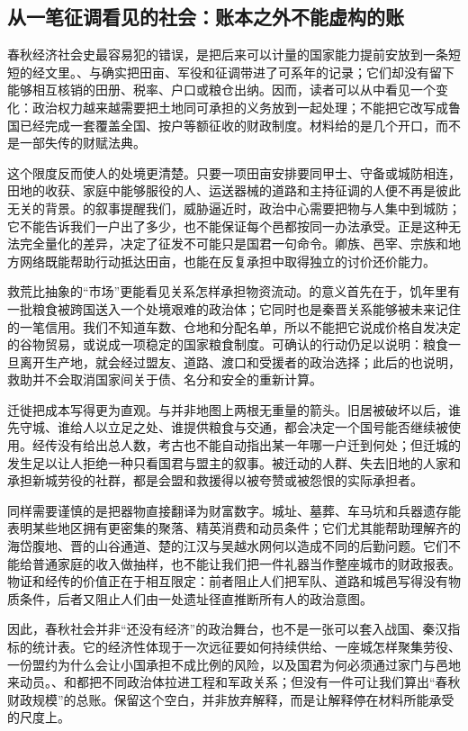 \subsection{从一笔征调看见的社会：账本之外不能虚构的账}

春秋经济社会史最容易犯的错误，是把后来可以计量的国家能力提前安放到一条短短的经文里。、与确实把田亩、军役和征调带进了可系年的记录；它们却没有留下能够相互核销的田册、税率、户口或粮仓出纳。因而，读者可以从中看见一个变化：政治权力越来越需要把土地同可承担的义务放到一起处理；不能把它改写成鲁国已经完成一套覆盖全国、按户等额征收的财政制度。材料给的是几个开口，而不是一部失传的财赋法典。

这个限度反而使人的处境更清楚。只要一项田亩安排要同甲士、守备或城防相连，田地的收获、家庭中能够服役的人、运送器械的道路和主持征调的人便不再是彼此无关的背景。的叙事提醒我们，威胁逼近时，政治中心需要把物与人集中到城防；它不能告诉我们一户出了多少，也不能保证每个邑都按同一办法承受。正是这种无法完全量化的差异，决定了征发不可能只是国君一句命令。卿族、邑宰、宗族和地方网络既能帮助行动抵达田亩，也能在反复承担中取得独立的讨价还价能力。

救荒比抽象的“市场”更能看见关系怎样承担物资流动。的意义首先在于，饥年里有一批粮食被跨国送入一个处境艰难的政治体；它同时也是秦晋关系能够被未来记住的一笔信用。我们不知道车数、仓地和分配名单，所以不能把它说成价格自发决定的谷物贸易，或说成一项稳定的国家粮食制度。可确认的行动仍足以说明：粮食一旦离开生产地，就会经过盟友、道路、渡口和受援者的政治选择；此后的也说明，救助并不会取消国家间关于债、名分和安全的重新计算。

迁徙把成本写得更为直观。与并非地图上两根无重量的箭头。旧居被破坏以后，谁先守城、谁给人以立足之处、谁提供粮食与交通，都会决定一个国号能否继续被使用。经传没有给出总人数，考古也不能自动指出某一年哪一户迁到何处；但迁城的发生足以让人拒绝一种只看国君与盟主的叙事。被迁动的人群、失去旧地的人家和承担新城劳役的社群，都是会盟和救援得以被夸赞或被怨恨的实际承担者。

同样需要谨慎的是把器物直接翻译为财富数字。城址、墓葬、车马坑和兵器遗存能表明某些地区拥有更密集的聚落、精英消费和动员条件；它们尤其能帮助理解齐的海岱腹地、晋的山谷通道、楚的江汉与吴越水网何以造成不同的后勤问题。它们不能给普通家庭的收入做抽样，也不能让我们把一件礼器当作整座城市的财政报表。物证和经传的价值正在于相互限定：前者阻止人们把军队、道路和城邑写得没有物质条件，后者又阻止人们由一处遗址径直推断所有人的政治意图。

因此，春秋社会并非“还没有经济”的政治舞台，也不是一张可以套入战国、秦汉指标的统计表。它的经济性体现于一次远征要如何持续供给、一座城怎样聚集劳役、一份盟约为什么会让小国承担不成比例的风险，以及国君为何必须通过家门与邑地来动员。、和都把不同政治体拉进工程和军政关系；但没有一件可让我们算出“春秋财政规模”的总账。保留这个空白，并非放弃解释，而是让解释停在材料所能承受的尺度上。
